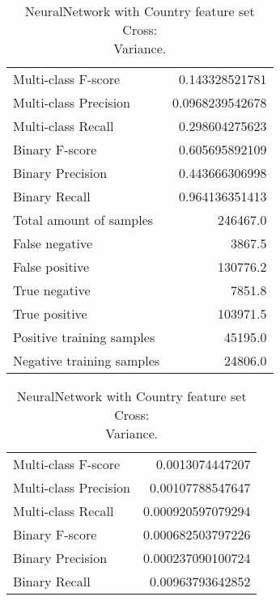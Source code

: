 \begin{table}[H]
\begin{minipage}{0.5\textwidth}
\caption{NeuralNetwork with Country feature set Cross: \\Average.}
\centering
\begin{tabular}{l r}
\toprule
Multi-class F-score & 0.143328521781 \\
Multi-class Precision & 0.0968239542678 \\
Multi-class Recall & 0.298604275623 \\
\midrule
Binary F-score & 0.605695892109 \\
Binary Precision & 0.443666306998 \\
Binary Recall & 0.964136351413 \\
\midrule
Total amount of samples & 246467.0 \\
False negative & 3867.5 \\
False positive & 130776.2 \\
True negative & 7851.8 \\
True positive & 103971.5 \\
\midrule
Positive training samples & 45195.0 \\
Negative training samples & 24806.0 \\
\bottomrule
\end{tabular}
\end{minipage}
\hfillx
\begin{minipage}{0.5\textwidth}
\caption{NeuralNetwork with Country feature set Cross: \\Variance.}
\centering
\begin{tabular}{l r}
\toprule
Multi-class F-score & 0.0013074447207 \\
Multi-class Precision & 0.00107788547647 \\
Multi-class Recall & 0.000920597079294 \\
\midrule
Binary F-score & 0.000682503797226 \\
Binary Precision & 0.000237090100724 \\
Binary Recall & 0.00963793642852 \\
\bottomrule
\end{tabular}
\end{minipage}
\end{table}
